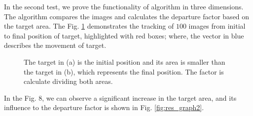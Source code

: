In the second test, we prove the functionality of algorithm in three dimensions. 
The algorithm compares the images and calculates the departure factor 
based on the target area. The Fig. \ref{fig:target} demonstrates the 
tracking of $100$ images from initial to final position of target, 
highlighted with red boxes;
where, the vector in blue describes the movement of target. 
\begin{figure}[!hbt]
\centering
  \caption{The target in (a) is the initial position and its area is smaller than the target in (b), 
  which represents the final position. The factor is calculate dividing both areas.}
  \label{fig:target}
\end{figure}
In the Fig. 8, we can observe a significant increase in the target area, and 
its influence to the departure factor is shown in Fig. \ref{fig:res_graph2}.

